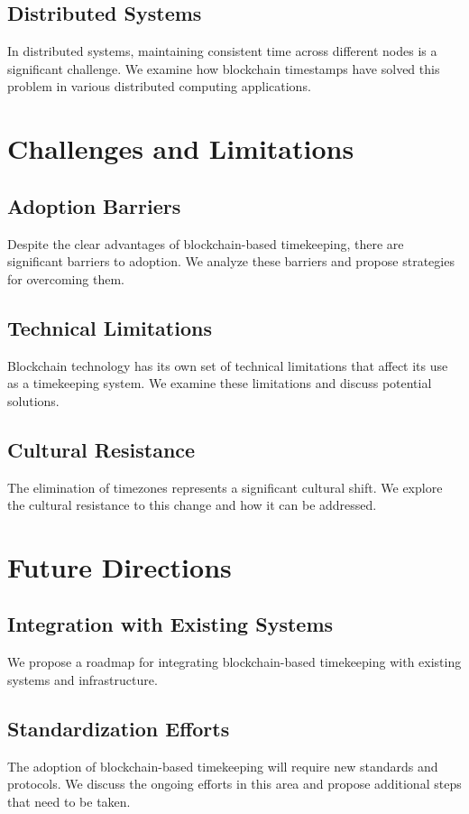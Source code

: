 \documentclass[12pt]{report}
\begin{document}
\section{Distributed Systems}
In distributed systems, maintaining consistent time across different nodes is a significant challenge. We examine how blockchain timestamps have solved this problem in various distributed computing applications.

\chapter{Challenges and Limitations}

\section{Adoption Barriers}
Despite the clear advantages of blockchain-based timekeeping, there are significant barriers to adoption. We analyze these barriers and propose strategies for overcoming them.

\section{Technical Limitations}
Blockchain technology has its own set of technical limitations that affect its use as a timekeeping system. We examine these limitations and discuss potential solutions.

\section{Cultural Resistance}
The elimination of timezones represents a significant cultural shift. We explore the cultural resistance to this change and how it can be addressed.

\chapter{Future Directions}

\section{Integration with Existing Systems}
We propose a roadmap for integrating blockchain-based timekeeping with existing systems and infrastructure.

\section{Standardization Efforts}
The adoption of blockchain-based timekeeping will require new standards and protocols. We discuss the ongoing efforts in this area and propose additional steps that need to be taken.
\end{document}
